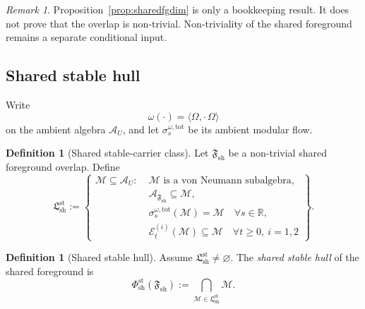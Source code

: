 \documentclass[12pt]{article}
\theoremstyle{definition}
\newtheorem{definition}[theorem]{Definition}
\theoremstyle{remark}
\newtheorem{remark}[theorem]{Remark}
\begin{document}
\begin{remark}
Proposition~\ref{prop:sharedfgdim} is only a bookkeeping result. It
does not prove that the overlap is non-trivial. Non-triviality of the
shared foreground remains a separate conditional input.
\end{remark}

\subsection{Shared stable hull}

Write
\[
\omega(\cdot)=\langle\Omega,\cdot\,\Omega\rangle
\]
on the ambient algebra \(\mathcal A_U\), and let
\(\sigma_s^{\omega,\mathrm{tot}}\) be its ambient modular flow.

\begin{definition}[Shared stable-carrier class]
\label{def:sharedcarrier}
Let \(\mathfrak F_{\mathrm{sh}}\) be a non-trivial shared foreground
overlap. Define
\[
\mathfrak L_{\mathrm{sh}}^{\mathrm{st}}
:=
\left\{
\begin{aligned}
\mathcal M\subseteq\mathcal A_U:\;&
\mathcal M \text{ is a von Neumann subalgebra},\\
&
\mathcal A_{\mathfrak F_{\mathrm{sh}}}\subseteq \mathcal M,\\
&
\sigma_s^{\omega,\mathrm{tot}}(\mathcal M)=\mathcal M
\quad \forall s\in\mathbb R,\\
&
\mathcal E_t^{(i)}(\mathcal M)\subseteq \mathcal M
\quad \forall t\ge 0,\ i=1,2
\end{aligned}
\right\}.
\]
\end{definition}

\begin{definition}[Shared stable hull]
\label{def:sharedhull}
Assume \(\mathfrak L_{\mathrm{sh}}^{\mathrm{st}}\neq \varnothing\). The
\emph{shared stable hull} of the shared foreground is
\[
\Phi_{\mathrm{sh}}^{\mathrm{st}}(\mathfrak F_{\mathrm{sh}})
:=
\bigcap_{\mathcal M\in\mathfrak L_{\mathrm{sh}}^{\mathrm{st}}}
\mathcal M.
\]
\end{definition}
\end{document}

